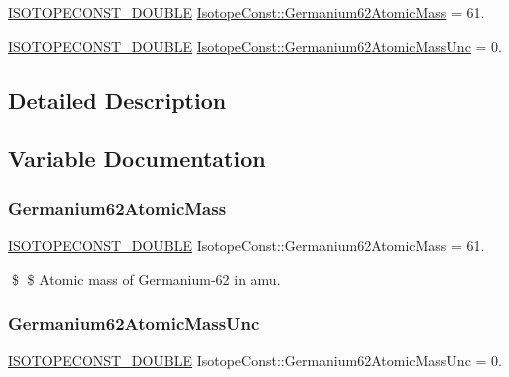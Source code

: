 \begin{DoxyCompactItemize}
\item 
\mbox{\hyperlink{group___isotope_const-_macros_ga8f45a7272ce02c0b4c65c44636ed719a}{I\+S\+O\+T\+O\+P\+E\+C\+O\+N\+S\+T\+\_\+\+D\+O\+U\+B\+LE}} \mbox{\hyperlink{group___isotope_const-_germanium-_ge62_gaf81d55766a3d447232fb9ef3911a19f6}{Isotope\+Const\+::\+Germanium62\+Atomic\+Mass}} = 61.
\item 
\mbox{\hyperlink{group___isotope_const-_macros_ga8f45a7272ce02c0b4c65c44636ed719a}{I\+S\+O\+T\+O\+P\+E\+C\+O\+N\+S\+T\+\_\+\+D\+O\+U\+B\+LE}} \mbox{\hyperlink{group___isotope_const-_germanium-_ge62_gaaac1a26794a3a37afb0e5b4a37f8b5a1}{Isotope\+Const\+::\+Germanium62\+Atomic\+Mass\+Unc}} = 0.
\end{DoxyCompactItemize}


\subsection{Detailed Description}


\subsection{Variable Documentation}
\mbox{\label{group___isotope_const-_germanium-_ge62_gaf81d55766a3d447232fb9ef3911a19f6}} 
\subsubsection{\texorpdfstring{Germanium62\+Atomic\+Mass}{Germanium62AtomicMass}}
{\footnotesize\ttfamily \mbox{\hyperlink{group___isotope_const-_macros_ga8f45a7272ce02c0b4c65c44636ed719a}{I\+S\+O\+T\+O\+P\+E\+C\+O\+N\+S\+T\+\_\+\+D\+O\+U\+B\+LE}} Isotope\+Const\+::\+Germanium62\+Atomic\+Mass = 61.}

\$ \$ Atomic mass of Germanium-\/62 in amu. \mbox{\label{group___isotope_const-_germanium-_ge62_gaaac1a26794a3a37afb0e5b4a37f8b5a1}} 
\subsubsection{\texorpdfstring{Germanium62\+Atomic\+Mass\+Unc}{Germanium62AtomicMassUnc}}
{\footnotesize\ttfamily \mbox{\hyperlink{group___isotope_const-_macros_ga8f45a7272ce02c0b4c65c44636ed719a}{I\+S\+O\+T\+O\+P\+E\+C\+O\+N\+S\+T\+\_\+\+D\+O\+U\+B\+LE}} Isotope\+Const\+::\+Germanium62\+Atomic\+Mass\+Unc = 0.}

